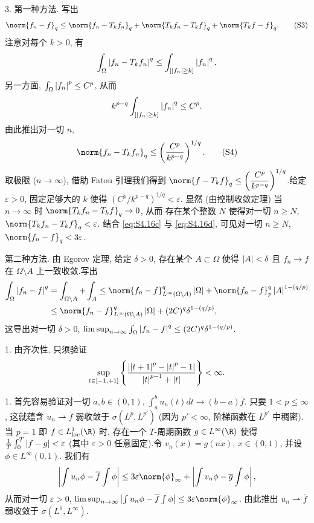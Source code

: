 3. 第一种方法. 写出
\begin{equation}
\norm{f_n-f}_q\le\norm{f_n-T_kf_n}_q+\norm{T_kf_n-T_kf}_q+\norm{T_kf-f}_q.
\tag{S3}
\label{eq:S4.16c}
\end{equation}
注意对每个 $k>0$, 有
\begin{equation*}
\int_\Omega\left|f_n-T_kf_n\right|^q\le\int_{[\left|f_n\right|\ge k]}\left|f_n\right|^q.
\end{equation*}
另一方面, $\int_\Omega\left|f_n\right|^p\le C^p$, 从而
\begin{equation*}
k^{p-q}\int_{[\left|f_n\right|\ge k]}\left|f_n\right|^q\le C^p.
\end{equation*}
由此推出对一切 $n$,
\begin{equation}
\norm{f_n-T_kf_n}_q\le\left(\frac{C^p}{k^{p-q}}\right)^{1/q}.
\tag{S4}
\label{eq:S4.16d}
\end{equation}
取极限 ($n\to\infty$), 借助 Fatou 引理我们得到
$\norm{f-T_kf}_q\le\left(\dfrac{C^p}{k^{p-q}}\right)^{1/q}$.给定
$\varepsilon>0$, 固定足够大的 $k$ 使得 $(C^p/k^{p-q})^{1/q}<\varepsilon$.
显然 (由控制收敛定理) 当 $n\to\infty$ 时 $\norm{T_kf_n-T_kf}_q\to0$, 从而
存在某个整数 $N$ 使得对一切 $n\ge N$, $\norm{T_kf_n-T_kf}_q<\varepsilon$.
结合 \eqref{eq:S4.16c} 与 \eqref{eq:S4.16d}, 可见对一切 $n\ge N$,
$\norm{f_n-f}_q<3\varepsilon$.

第二种方法. 由 Egorov 定理, 给定 $\delta>0$, 存在某个 $A\subset\Omega$ 使得
$\left|A\right|<\delta$ 且 $f_n\to f$ 在 $\Omega\setminus A$ 上一致收敛.写出
\begin{align*}
\int_\Omega\abs{f_n-f}^q&=\int_{\Omega\setminus A}+\int_A
\le\norm{f_n-f}_{L^\infty(\Omega\setminus A)}^q\abs{\Omega}+\norm{f_n-f}_p^q\abs{A}^{1-(q/p)}\\
&\le\norm{f_n-f}_{L^\infty(\Omega\setminus A)}^q\abs{\Omega}+(2C)^q\delta^{1-(q/p)},
\end{align*}
这导出对一切 $\delta>0$, $\limsup_{n\to\infty}\int_\Omega\left|f_n-f\right|^q\le(2C)^q\delta^{1-(q/p)}$.


1. 由齐次性, 只须验证
\begin{equation*}
\sup_{t\in[-1,+1]}\left\{\frac{\left|\left|t+1\right|^p-\left|t\right|^p-1\right|}{\left|t\right|^{p-1}+\left|t\right|}\right\}<\infty.
\end{equation*}


1. 首先容易验证对一切 $a,b\in(0,1)$, $\int_a^bu_n(t)dt\to(b-a)\overline f$.
只要 $1<p\le\infty$, 这就蕴含 $u_n\rightharpoonup\overline f$ 弱收敛于
$\sigma(L^p,L^{p'})$ (因为 $p'<\infty$, 阶梯函数在 $L^{p'}$ 中稠密).
当 $p=1$ 即 $f\in L^1_{\text{loc}}(\R)$ 时, 存在一个 $T$-周期函数
$g\in L^\infty(\R)$ 使得 $\frac1T\int_0^T\left|f-g\right|<\varepsilon$ (其中
$\varepsilon>0$ 任意固定).令 $v_n(x)=g(nx)$, $x\in(0,1)$, 并设 $\phi\in L^\infty(0,1)$.
我们有
\begin{equation*}
\abs{\int u_n\phi-\overline f\int\phi}\le3\varepsilon\norm{\phi}_\infty+\abs{\int v_n\phi-\overline g\int\phi},
\end{equation*}
从而对一切 $\varepsilon>0$, $\limsup_{n\to\infty}\abs{\int u_n\phi-\overline f\int\phi}\le3\varepsilon\norm{\phi}_\infty$.
由此推出 $u_n\rightharpoonup\overline f$ 弱收敛于 $\sigma(L^1,L^\infty)$.

